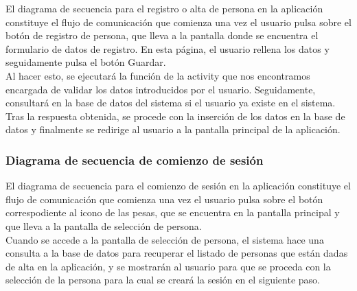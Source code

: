 El diagrama de secuencia para el registro o alta de persona en la aplicación constituye el flujo de comunicación que comienza una vez el usuario pulsa sobre el botón de registro de persona, que lleva a la pantalla donde se encuentra el formulario de datos de registro. En esta página, el usuario rellena los datos y seguidamente pulsa el botón Guardar.\\

Al hacer esto, se ejecutará la función de la activity que nos encontramos encargada de validar los datos introducidos por el usuario. Seguidamente, consultará en la base de datos del sistema si el usuario ya existe en el sistema.\\

Tras la respuesta obtenida, se procede con la inserción de los datos en la base de datos y finalmente se redirige al usuario a la pantalla principal de la aplicación.


\subsubsection{Diagrama de secuencia de comienzo de sesión}

El diagrama de secuencia para el comienzo de sesión en la aplicación constituye el flujo de comunicación que comienza una vez el usuario pulsa sobre el botón correspodiente al icono de las pesas, que se encuentra en la pantalla principal y que lleva a la pantalla de selección de persona.\\

Cuando se accede a la pantalla de selección de persona, el sistema hace una consulta a la base de datos para recuperar el listado de personas que están dadas de alta en la aplicación, y se mostrarán al usuario para que se proceda con la selección de la persona para la cual se creará la sesión en el siguiente paso.\\


